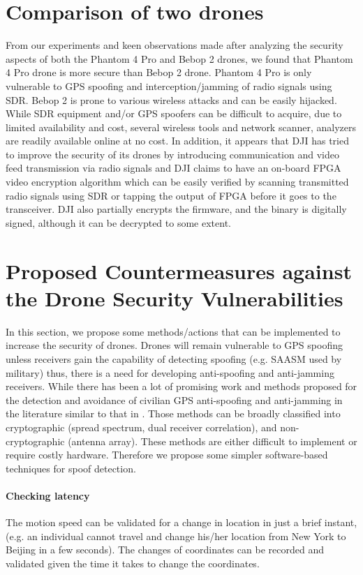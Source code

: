 \documentclass[conference]{IEEEtran}
\begin{document}
\section{Comparison of two drones}\label{Comparison of two drones}
From our experiments and keen observations made after analyzing the security aspects of both the Phantom 4 Pro and Bebop 2 drones, we found that Phantom 4 Pro drone is more secure than Bebop 2 drone.
Phantom 4 Pro is only vulnerable to GPS spoofing and interception/jamming of radio signals using SDR.
Bebop 2 is prone to various wireless attacks and can be easily hijacked.
While SDR equipment and/or GPS spoofers can be difficult to acquire, due to limited availability and cost, several wireless tools and network scanner, analyzers are readily available online at no cost. 
In addition, it appears that DJI has tried to improve the security of its drones by introducing communication and video feed transmission via radio signals and DJI claims to have an on-board FPGA video encryption algorithm which can be easily verified by scanning transmitted radio signals using SDR or tapping the output of FPGA before it goes to the transceiver. 
DJI also partially encrypts the firmware, and the binary is digitally signed, although it can be decrypted to some extent. 

\section{Proposed Countermeasures against the Drone Security Vulnerabilities}\label{Proposed countermeasures}
In this section,  we propose some methods/actions that can be implemented to increase the security of drones. 
Drones will remain vulnerable to GPS spoofing unless receivers gain the capability of detecting spoofing (e.g. SAASM used by military) thus, there is a need for developing anti-spoofing and anti-jamming receivers.
While there has been a lot of promising work and methods proposed  for the detection and avoidance of civilian GPS anti-spoofing and anti-jamming in the literature similar to that in \cite{wesson2012straight}.
Those methods can be broadly classified into cryptographic (spread spectrum, dual receiver correlation), and non-cryptographic (antenna array). These methods are either difficult to implement or require costly hardware. Therefore we propose some simpler software-based techniques for spoof detection.

\paragraph*{Checking latency}
The motion speed can be validated for a change in location in just a brief instant, (e.g. an individual cannot travel and change his/her location from New York to Beijing in a few seconds).
The changes of coordinates can be recorded and validated given the time it takes to change the coordinates.
\end{document}
